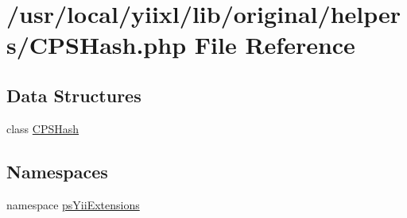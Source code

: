 \hypertarget{CPSHash_8php}{
\section{/usr/local/yiixl/lib/original/helpers/CPSHash.php File Reference}
\label{CPSHash_8php}
}
\subsection*{Data Structures}
\begin{DoxyCompactItemize}
\item 
class \hyperlink{classCPSHash}{CPSHash}
\end{DoxyCompactItemize}
\subsection*{Namespaces}
\begin{DoxyCompactItemize}
\item 
namespace \hyperlink{namespacepsYiiExtensions}{psYiiExtensions}
\end{DoxyCompactItemize}
